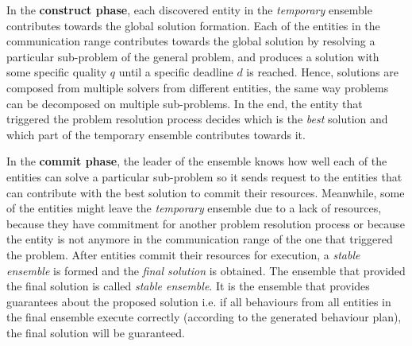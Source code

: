 \documentclass[journal]{IEEEtran}
\theoremstyle{definition}
\newcommand\darko[1]{\nb{Darko}{#1}}
\begin{document}
 In the \textbf{construct phase}, each discovered entity in the \textit{temporary} ensemble contributes towards the global solution formation.
 Each of the entities in the communication range contributes towards the global solution by resolving a particular sub-problem of the general problem, and produces a solution with some specific quality $q$ until a specific deadline $d$ is reached. Hence, solutions are composed from multiple solvers from different entities, the same way problems can be decomposed on multiple sub-problems. In the end, the entity that triggered the problem resolution process  decides which is the \textit{best} solution and which part of the temporary ensemble contributes towards it.
 
In the \textbf{commit phase}, the leader of the ensemble knows how well each of the entities can solve a particular sub-problem so it sends request to the entities that can contribute with the best solution to commit their resources. 
Meanwhile, some of the entities might leave the \textit{temporary} ensemble due to a lack of resources, because they have commitment for another problem resolution process or because the entity is not anymore in the communication range of the one that triggered the problem\darko{this is not in the code}.
After entities commit their resources for execution,   a \textit{stable ensemble} is formed and the \textit{final solution} is obtained.
The ensemble that provided the final solution is called \textit{stable ensemble}. It is the ensemble that provides guarantees about the proposed solution i.e. if all behaviours from all entities in the final ensemble execute correctly (according to the generated behaviour plan), the final solution will be guaranteed.
\end{document}
